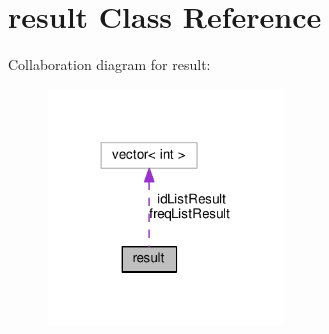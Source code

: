 \section{result Class Reference}
\label{classresult}


Collaboration diagram for result\+:\nopagebreak
\begin{figure}[H]
\begin{center}
\leavevmode
\includegraphics[width=177pt]{classresult__coll__graph}
\end{center}
\end{figure}
